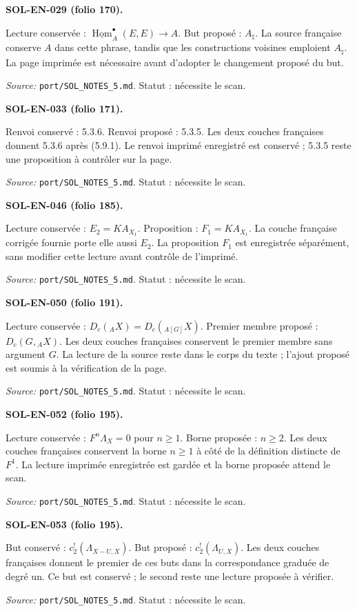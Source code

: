 \medskip\noindent\textbf{SOL-EN-029 (folio 170).}\par
Lecture conservée : $\underline{\operatorname{Hom}}_A^\bullet(E,E)\to A$. But proposé : $A_\natural$.
La source française conserve $A$ dans cette phrase, tandis que les constructions voisines emploient $A_\natural$. La page imprimée est nécessaire avant d’adopter le changement proposé du but.
\par\noindent\textit{Source: }\texttt{port/SOL\_NOTES\_5.md}. Statut : nécessite le scan.

\medskip\noindent\textbf{SOL-EN-033 (folio 171).}\par
Renvoi conservé : 5.3.6. Renvoi proposé : 5.3.5.
Les deux couches françaises donnent 5.3.6 après (5.9.1). Le renvoi imprimé enregistré est conservé ; 5.3.5 reste une proposition à contrôler sur la page.
\par\noindent\textit{Source: }\texttt{port/SOL\_NOTES\_5.md}. Statut : nécessite le scan.

\medskip\noindent\textbf{SOL-EN-046 (folio 185).}\par
Lecture conservée : $E_2=KA_{X_1}$. Proposition : $F_1=KA_{X_1}$.
La couche française corrigée fournie porte elle aussi $E_2$. La proposition $F_1$ est enregistrée séparément, sans modifier cette lecture avant contrôle de l’imprimé.
\par\noindent\textit{Source: }\texttt{port/SOL\_NOTES\_5.md}. Statut : nécessite le scan.

\medskip\noindent\textbf{SOL-EN-050 (folio 191).}\par
Lecture conservée : $D_c({}_AX)=D_c({}_{A[G]}X)$. Premier membre proposé : $D_c(G,{}_AX)$.
Les deux couches françaises conservent le premier membre sans argument $G$. La lecture de la source reste dans le corps du texte ; l’ajout proposé est soumis à la vérification de la page.
\par\noindent\textit{Source: }\texttt{port/SOL\_NOTES\_5.md}. Statut : nécessite le scan.

\medskip\noindent\textbf{SOL-EN-052 (folio 195).}\par
Lecture conservée : $F^n\Lambda_X=0$ pour $n\geq1$. Borne proposée : $n\geq2$.
Les deux couches françaises conservent la borne $n\geq1$ à côté de la définition distincte de $F^1$. La lecture imprimée enregistrée est gardée et la borne proposée attend le scan.
\par\noindent\textit{Source: }\texttt{port/SOL\_NOTES\_5.md}. Statut : nécessite le scan.

\medskip\noindent\textbf{SOL-EN-053 (folio 195).}\par
But conservé : $c_2^!(\Lambda_{X-U,X})$. But proposé : $c_2^!(\Lambda_{U,X})$.
Les deux couches françaises donnent le premier de ces buts dans la correspondance graduée de degré un. Ce but est conservé ; le second reste une lecture proposée à vérifier.
\par\noindent\textit{Source: }\texttt{port/SOL\_NOTES\_5.md}. Statut : nécessite le scan.

